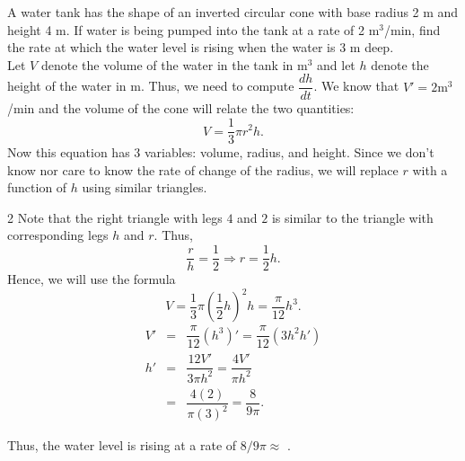 \documentclass{book}
\begin{document}
\begin{Exam} A water tank has the shape of an inverted circular cone with base radius 2 m and height 4 m. If water is being pumped into the tank at a rate of 2 $\mbox{m}^3$/min, find the rate at which the water level is rising when the water is 3 m deep.\\

Let $V$ denote the volume of the water in the tank in $\mbox{m}^3$ and let $h$ denote the height of the water in m. Thus, we need to compute $\dfrac{dh}{dt}$. We know that $V' = 2 \mbox{m}^3$/min and the volume of the cone will relate the two quantities: \[V = \dfrac{1}{3}\pi r^2h.\] Now this equation has 3 variables: volume, radius, and height. Since we don't know nor care to know the rate of change of the radius, we will replace $r$ with a function of $h$ using similar triangles. \\

\begin{multicols}{2}
Note that the right triangle with legs $4$ and $2$ is similar to the triangle with corresponding legs $h$ and $r$. Thus, \[\dfrac{r}{h} = \dfrac{1}{2} \Rightarrow r = \dfrac{1}{2}h.\] Hence, we will use the formula \[V = \dfrac{1}{3}\pi \left(\dfrac{1}{2}h\right)^2h = \dfrac{\pi}{12}h^3.\] 
\begin{eqnarray*}
V' &=& \dfrac{\pi}{12}(h^3)'  = \dfrac{\pi}{12}(3h^2h')\\
h' &=& \dfrac{12V'}{3\pi h^2} = \dfrac{4V'}{\pi h^2}\\
&=& \dfrac{4(2)}{\pi (3)^2} = \dfrac{8}{9\pi}.
\end{eqnarray*} \columnbreak
\begin{center}
\end{center}
\end{multicols}
Thus, the water level is rising at a rate of $8/9\pi \approx$ . 
\end{Exam}\vs
\end{document}
